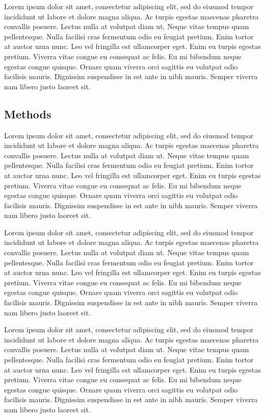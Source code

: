 \documentclass[
  twocolumn]{article}
\begin{document}
Lorem ipsum dolor sit amet, consectetur adipiscing elit, sed do eiusmod
tempor incididunt ut labore et dolore magna aliqua. Ac turpis egestas
maecenas pharetra convallis posuere. Lectus nulla at volutpat diam ut.
Neque vitae tempus quam pellentesque. Nulla facilisi cras fermentum odio
eu feugiat pretium. Enim tortor at auctor urna nunc. Leo vel fringilla
est ullamcorper eget. Enim eu turpis egestas pretium. Viverra vitae
congue eu consequat ac felis. Eu mi bibendum neque egestas congue
quisque. Ornare quam viverra orci sagittis eu volutpat odio facilisis
mauris. Dignissim suspendisse in est ante in nibh mauris. Semper viverra
nam libero justo laoreet sit.

\hypertarget{methods}{%
\subsection{Methods}\label{methods}}

Lorem ipsum dolor sit amet, consectetur adipiscing elit, sed do eiusmod
tempor incididunt ut labore et dolore magna aliqua. Ac turpis egestas
maecenas pharetra convallis posuere. Lectus nulla at volutpat diam ut.
Neque vitae tempus quam pellentesque. Nulla facilisi cras fermentum odio
eu feugiat pretium. Enim tortor at auctor urna nunc. Leo vel fringilla
est ullamcorper eget. Enim eu turpis egestas pretium. Viverra vitae
congue eu consequat ac felis. Eu mi bibendum neque egestas congue
quisque. Ornare quam viverra orci sagittis eu volutpat odio facilisis
mauris. Dignissim suspendisse in est ante in nibh mauris. Semper viverra
nam libero justo laoreet sit.

Lorem ipsum dolor sit amet, consectetur adipiscing elit, sed do eiusmod
tempor incididunt ut labore et dolore magna aliqua. Ac turpis egestas
maecenas pharetra convallis posuere. Lectus nulla at volutpat diam ut.
Neque vitae tempus quam pellentesque. Nulla facilisi cras fermentum odio
eu feugiat pretium. Enim tortor at auctor urna nunc. Leo vel fringilla
est ullamcorper eget. Enim eu turpis egestas pretium. Viverra vitae
congue eu consequat ac felis. Eu mi bibendum neque egestas congue
quisque. Ornare quam viverra orci sagittis eu volutpat odio facilisis
mauris. Dignissim suspendisse in est ante in nibh mauris. Semper viverra
nam libero justo laoreet sit.

Lorem ipsum dolor sit amet, consectetur adipiscing elit, sed do eiusmod
tempor incididunt ut labore et dolore magna aliqua. Ac turpis egestas
maecenas pharetra convallis posuere. Lectus nulla at volutpat diam ut.
Neque vitae tempus quam pellentesque. Nulla facilisi cras fermentum odio
eu feugiat pretium. Enim tortor at auctor urna nunc. Leo vel fringilla
est ullamcorper eget. Enim eu turpis egestas pretium. Viverra vitae
congue eu consequat ac felis. Eu mi bibendum neque egestas congue
quisque. Ornare quam viverra orci sagittis eu volutpat odio facilisis
mauris. Dignissim suspendisse in est ante in nibh mauris. Semper viverra
nam libero justo laoreet sit.
\end{document}
